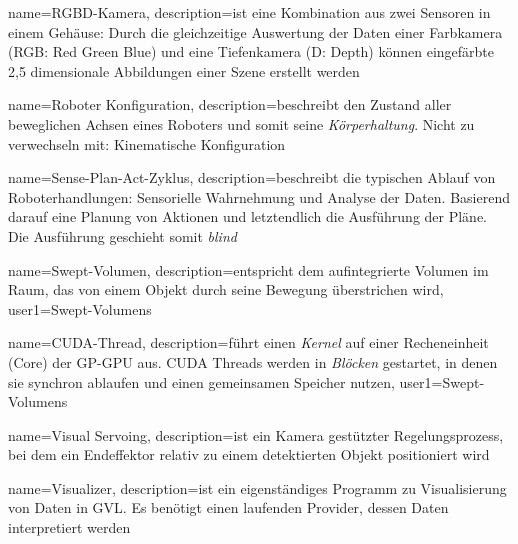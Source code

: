 {
	name=RGBD-Kamera,
	description={ist eine Kombination aus zwei Sensoren in einem Gehäuse: Durch die gleichzeitige Auswertung der Daten einer Farbkamera (RGB: Red Green Blue) und eine Tiefenkamera (D: Depth) können eingefärbte 2,5 dimensionale Abbildungen einer Szene erstellt werden}
}

{
	name=Roboter Konfiguration,
	description={beschreibt den Zustand aller beweglichen Achsen eines Roboters und somit seine \textit{Körperhaltung}. Nicht zu verwechseln mit: \Gls{Kinematische Konfiguration}}
}

{
	name=Sense-Plan-Act-Zyklus,
	description={beschreibt die typischen Ablauf von Roboterhandlungen: Sensorielle Wahrnehmung und Analyse der Daten. Basierend darauf eine Planung von Aktionen und letztendlich die Ausführung der Pläne. Die Ausführung geschieht somit \textit{blind}}
}

{
	name=Swept-Volumen,
	description={entspricht dem aufintegrierte Volumen im Raum, das von einem Objekt durch seine Bewegung überstrichen wird},
	user1={Swept-Volumens}
}


{
	name=CUDA-Thread,
	description={führt einen \textit{Kernel} auf einer Recheneinheit (Core) der GP-GPU aus. CUDA Threads werden in \textit{Blöcken} gestartet, in denen sie synchron ablaufen und einen gemeinsamen Speicher nutzen},
	user1={Swept-Volumens}
}



{
	name=Visual Servoing,
	description={ist ein Kamera gestützter Regelungsprozess, bei dem ein \Gls{Endeffektor} relativ zu einem detektierten Objekt positioniert wird}
}

{
	name=Visualizer,
	description={ist ein eigenständiges Programm zu Visualisierung von Daten in \Gls{GVL}. Es benötigt einen laufenden \Gls{Provider}, dessen Daten interpretiert werden}
}

